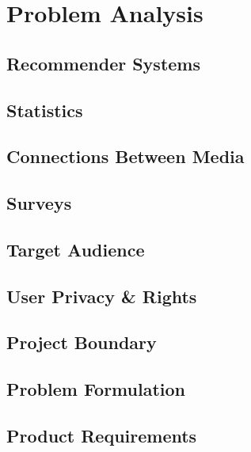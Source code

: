 \chapter{Problem Analysis}

\section{Recommender Systems}
\label{RecommenderSystems}

\section{Statistics}
\label{Statistics}

\section{Connections Between Media}
\label{Connections}

\section{Surveys}
\label{Surveys}

\section{Target Audience}
\label{TargetAudience}

\section{User Privacy & Rights}
\label{User Rights}

\section{Project Boundary}
\label{Boundary}

\section{Problem Formulation}
\label{Formulation}

\section{Product Requirements}
\label{Requirements}
